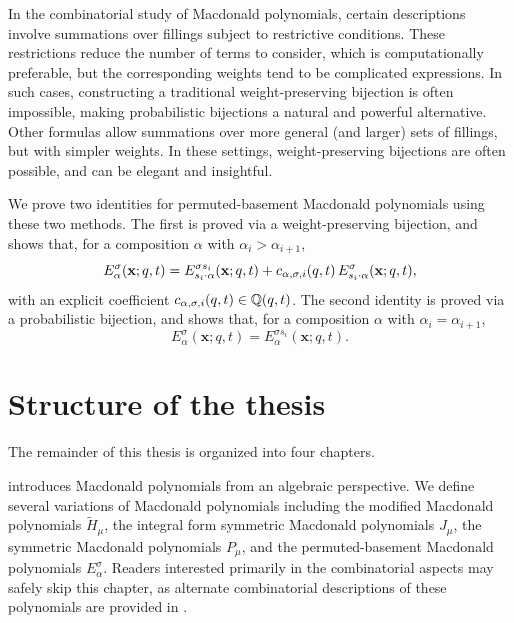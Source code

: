 In the combinatorial study of Macdonald polynomials, certain descriptions involve summations over fillings subject to restrictive conditions.
These restrictions reduce the number of terms to consider,
which is computationally preferable,
but the corresponding weights tend to be complicated expressions.
In such cases, constructing a traditional weight-preserving bijection is often impossible, making probabilistic bijections a natural and powerful alternative.
Other formulas allow summations over more general (and larger) sets of fillings, but with simpler weights.
In these settings, weight-preserving bijections are often possible, and can be elegant and insightful.

We prove two identities for permuted-basement Macdonald polynomials using these two methods.
The first is proved via a weight-preserving bijection,
and shows that, for a composition \(\alpha\) with \(\alpha_i > \alpha_{i+1}\),
\begin{equation*}
    E_{\alpha}^\sigma(\mathbf{x};q,t)
    =
    E_{s_i \cdot \alpha}^{\sigma s_i}(\mathbf{x};q,t)
    +
    c_{\alpha,\sigma,i}(q,t)
    \,
    E_{s_i \cdot \alpha}^\sigma(\mathbf{x};q,t),
\end{equation*}
with an explicit coefficient \(c_{\alpha,\sigma,i}(q,t) \in \mathbb{Q}(q,t)\).
The second identity is proved via a probabilistic bijection,
and shows that, for a composition \(\alpha\) with \(\alpha_i = \alpha_{i+1}\),
\begin{equation*}
    E_{\alpha}^\sigma(\mathbf{x};q,t)
    =
    E_{\alpha}^{\sigma s_i}(\mathbf{x};q,t).
\end{equation*}

\section*{Structure of the thesis}

The remainder of this thesis is organized into four chapters.

 introduces Macdonald polynomials from an algebraic perspective.
We define several variations of Macdonald polynomials including
the modified Macdonald polynomials \(\tilde{H}_\mu\),
the integral form symmetric Macdonald polynomials \(J_\mu\),
the symmetric Macdonald polynomials \(P_\mu\),
and the permuted-basement Macdonald polynomials \(E_\alpha^\sigma\).
Readers interested primarily in the combinatorial aspects may safely skip this chapter,
as alternate combinatorial descriptions of these polynomials are provided in .

